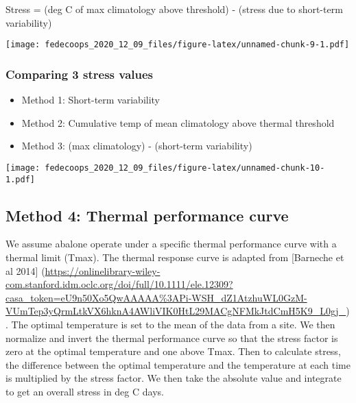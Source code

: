 \documentclass[]{article}
\begin{document}
Stress = (deg C of max climatology above threshold) - (stress due to
short-term variability)

\texttt{[image: fedecoops\_2020\_12\_09\_files/figure-latex/unnamed-chunk-9-1.pdf]}

\hypertarget{comparing-3-stress-values}{%
\subsubsection{Comparing 3 stress
values}\label{comparing-3-stress-values}}

\begin{itemize}
\item
  Method 1: Short-term variability
\item
  Method 2: Cumulative temp of mean climatology above thermal threshold
\item
  Method 3: (max climatology) - (short-term variability)
\end{itemize}

\texttt{[image: fedecoops\_2020\_12\_09\_files/figure-latex/unnamed-chunk-10-1.pdf]}

\hypertarget{method-4-thermal-performance-curve}{%
\subsection{Method 4: Thermal performance
curve}\label{method-4-thermal-performance-curve}}

We assume abalone operate under a specific thermal performance curve
with a thermal limit (Tmax). The thermal response curve is adapted from
{[}Barneche et al 2014{]}
(\url{https://onlinelibrary-wiley-com.stanford.idm.oclc.org/doi/full/10.1111/ele.12309?casa_token=eU9n50Xo5QwAAAAA\%3APi-WSH_dZ1AtzhuWL0GzM-VUmTep3yQrmLtkVX6hknA4AWliVIK0HtL29MACgNFMkJtdCmH5K9_L0gj_}).
The optimal temperature is set to the mean of the data from a site. We
then normalize and invert the thermal performance curve so that the
stress factor is zero at the optimal temperature and one above Tmax.
Then to calculate stress, the difference between the optimal temperature
and the temperature at each time is multiplied by the stress factor. We
then take the absolute value and integrate to get an overall stress in
deg C days.
\end{document}
